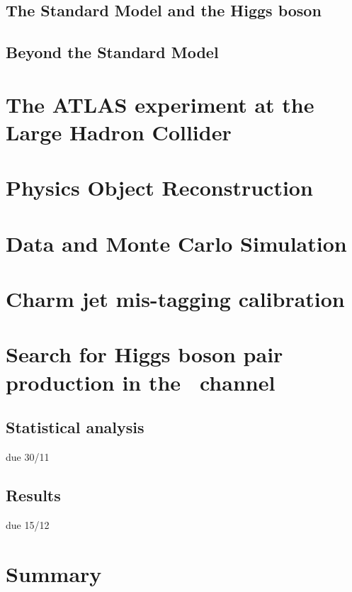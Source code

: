 \documentclass[twoside,11pt]{report}
\begin{document}
\section{The Standard Model and the Higgs boson}
\section{Beyond the Standard Model}
\large
\chapter{The ATLAS experiment at the Large Hadron Collider}


\chapter{Physics Object Reconstruction}



 
\chapter{Data and Monte Carlo Simulation}

\chapter{Charm jet mis-tagging calibration}





\large
\chapter{Search for Higgs boson pair production in the \bbtt\ channel}
\label{sec:search for dihiggs}







\label{sec:DiHiggs:systematics}
\section{Statistical analysis}
\label{sec:DiHiggs:analysis}
due 30/11
\section{Results}
\label{sec:DiHiggs:results}
due 15/12
\chapter{Summary}
\printbibliography
\appendix


\end{document}
